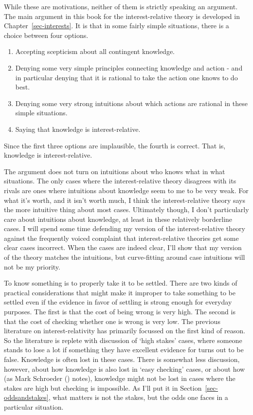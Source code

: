 \documentclass[
  10pt,
  letterpaper,
  twoside]{scrbook}
\providecommand{\tightlist}{%
  \setlength{\itemsep}{0pt}\setlength{\parskip}{0pt}}\usepackage{longtable,booktabs,array}
\begin{document}
While these are motivations, neither of them is strictly speaking an
argument. The main argument in this book for the interest-relative
theory is developed in Chapter~\ref{sec-interests}. It is that in some
fairly simple situations, there is a choice between four options.

\begin{enumerate}
\def\labelenumi{\arabic{enumi}.}
\tightlist
\item
  Accepting scepticism about all contingent knowledge.
\item
  Denying some very simple principles connecting knowledge and action -
  and in particular denying that it is rational to take the action one
  knows to do best.
\item
  Denying some very strong intuitions about which actions are rational
  in these simple situations.
\item
  Saying that knowledge is interest-relative.
\end{enumerate}

Since the first three options are implausible, the fourth is correct.
That is, knowledge is interest-relative.

The argument does not turn on intuitions about who knows what in what
situations. The only cases where the interest-relative theory disagrees
with its rivals are ones where intuitions about knowledge seem to me to
be very weak. For what it's worth, and it isn't worth much, I think the
interest-relative theory says the more intuitive thing about most cases.
Ultimately though, I don't particularly care about intuitions about
knowledge, at least in these relatively borderline cases. I will spend
some time defending my version of the interest-relative theory against
the frequently voiced complaint that interest-relative theories get some
clear cases incorrect. When the cases are indeed clear, I'll show that
my version of the theory matches the intuitions, but curve-fitting
around case intuitions will not be my priority.

To know something is to properly take it to be settled. There are two
kinds of practical considerations that might make it improper to take
something to be settled even if the evidence in favor of settling is
strong enough for everyday purposes. The first is that the cost of being
wrong is very high. The second is that the cost of checking whether one
is wrong is very low. The previous literature on interest-relativity has
primarily focussed on the first kind of reason. So the literature is
replete with discussion of `high stakes' cases, where someone stands to
lose a lot if something they have excellent evidence for turns out to be
false. Knowledge is often lost in these cases. There is somewhat less
discussion, however, about how knowledge is also lost in `easy checking'
cases, or about how (as Mark Schroeder
() notes), knowledge might not be lost
in cases where the stakes are high but checking is impossible. As I'll
put it in Section~\ref{sec-oddsandstakes}, what matters is not the
stakes, but the odds one faces in a particular situation.
\end{document}
